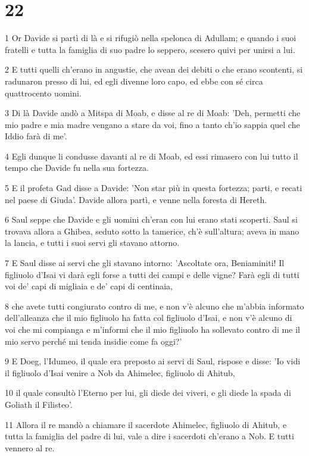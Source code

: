 \chapter{22}

\par 1 Or Davide si partì di là e si rifugiò nella spelonca di Adullam; e quando i suoi fratelli e tutta la famiglia di suo padre lo seppero, scesero quivi per unirsi a lui.
\par 2 E tutti quelli ch'erano in angustie, che avean dei debiti o che erano scontenti, si radunaron presso di lui, ed egli divenne loro capo, ed ebbe con sé circa quattrocento uomini.
\par 3 Di là Davide andò a Mitspa di Moab, e disse al re di Moab: 'Deh, permetti che mio padre e mia madre vengano a stare da voi, fino a tanto ch'io sappia quel che Iddio farà di me'.
\par 4 Egli dunque li condusse davanti al re di Moab, ed essi rimasero con lui tutto il tempo che Davide fu nella sua fortezza.
\par 5 E il profeta Gad disse a Davide: 'Non star più in questa fortezza; parti, e recati nel paese di Giuda'. Davide allora partì, e venne nella foresta di Hereth.
\par 6 Saul seppe che Davide e gli uomini ch'eran con lui erano stati scoperti. Saul si trovava allora a Ghibea, seduto sotto la tamerice, ch'è sull'altura; aveva in mano la lancia, e tutti i suoi servi gli stavano attorno.
\par 7 E Saul disse ai servi che gli stavano intorno: 'Ascoltate ora, Beniaminiti! Il figliuolo d'Isai vi darà egli forse a tutti dei campi e delle vigne? Farà egli di tutti voi de' capi di migliaia e de' capi di centinaia,
\par 8 che avete tutti congiurato contro di me, e non v'è alcuno che m'abbia informato dell'alleanza che il mio figliuolo ha fatta col figliuolo d'Isai, e non v'è alcuno di voi che mi compianga e m'informi che il mio figliuolo ha sollevato contro di me il mio servo perché mi tenda insidie come fa oggi?'
\par 9 E Doeg, l'Idumeo, il quale era preposto ai servi di Saul, rispose e disse: 'Io vidi il figliuolo d'Isai venire a Nob da Ahimelec, figliuolo di Ahitub,
\par 10 il quale consultò l'Eterno per lui, gli diede dei viveri, e gli diede la spada di Goliath il Filisteo'.
\par 11 Allora il re mandò a chiamare il sacerdote Ahimelec, figliuolo di Ahitub, e tutta la famiglia del padre di lui, vale a dire i sacerdoti ch'erano a Nob. E tutti vennero al re.
